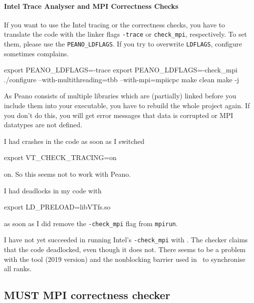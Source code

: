 \paragraph{Intel Trace Analyser and MPI Correctness Checks}

If you want to use the Intel tracing or the correctness checks, you have to
translate the code with the linker flags \texttt{-trace} or \texttt{check\_mpi},
respectively.
To set them, please use the \texttt{PEANO\_LDFLAGS}.
If you try to overwrite \texttt{LDFLAGS}, configure sometimes complains.


\begin{code}
 export PEANO_LDFLAGS=-trace
 export PEANO_LDFLAGS=-check_mpi
 ./configure --with-multithreading=tbb --with-mpi=mpiicpc
 make clean
 make -j
\end{code}


\noindent
As Peano consists of multiple libraries which are (partially) linked before you
include them into your executable, you have to rebuild the whole project again.
If you don't do this, you will get error messages that data is corrupted or MPI
datatypes are not defined.



\begin{remark}
 I had crashes in the code as soon as I switched
 \begin{code}
 export VT_CHECK_TRACING=on
 \end{code}
 on. So this seems not to work with Peano.
\end{remark}



\begin{remark}
 I had deadlocks in my code with
 \begin{code}
 export LD_PRELOAD=libVTfs.so
 \end{code}
 as soon as I did remove the \texttt{-check\_mpi} flag from \texttt{mpirun}.
\end{remark}



\begin{remark}
 I have not yet succeeded in running Intel's \texttt{-check\_mpi} with \ExaHyPE.
 The checker claims that the code deadlocked, even though it does not. There
 seems to be a problem with the tool (2019 version) and the nonblocking barrier
 used in \ExaHyPE\ to synchronise all ranks.
\end{remark}


\subsection{MUST MPI correctness checker}
\label{section:supercomputers:MUST}

